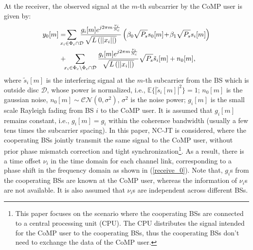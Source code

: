 \documentclass[10pt, doublecolumn]{IEEEtran}
\begin{document}
{At the receiver, {\color{black}the observed signal at the $m$-th subcarrier} by the CoMP user is given by:
\begin{align}\label{receive_0}
  y_0[m]=\!\!\!\!\!\!&\sum_{x_i\in \Phi _c\cap \mathcal{D}}{\!\!\!\!\frac{g_i[m]e^{j2\pi m \frac{\nu_i}{N_c}}}{\sqrt{L\left( ||x_i|| \right)}}\left( \beta _0\sqrt{P_s}s_0[m]\!+\!\beta _1\sqrt{P_s}s_i[m] \right)}\\\notag
  &+\!\!\!\sum_{x_i\in \Phi _c\backslash \Phi _c\cap \mathcal{D}}{\frac{g_i[m]e^{j2\pi m \frac{\nu_i}{N_c}}}{\sqrt{L\left( ||x_i|| \right)}}\sqrt{P_s}\tilde{s}_i[m]}+n_0[m],
\end{align}
where $\tilde{s}_i[m]$ is the interfering signal at the $m$-th subcarrier from the BS which is outside disc $\mathcal{D}$, whose power is normalized, i.e., $\mathbb{E}\{|\tilde{s}_i[m]|^2\}=1$;
$n_0[m]$ is the gaussian noise, $n_0[m] \sim \mathcal{CN}(0,\sigma^2)$, $\sigma^2$ is the noise power;
$g_i[m]$ is the small scale Rayleigh fading from BS $i$  to the CoMP user. It is assumed that $g_i[m]$ remains constant, i.e., $g_i[m]=g_i$ within the coherence bandwidth\cite{tanbourgi2014tractable} (usually a few tens times the subcarrier spacing).
In this paper, NC-JT is considered, where the cooperating BSs jointly transmit the same signal to the CoMP user, without prior phase mismatch correction and tight synchronization\cite{tanbourgi2014tractable}{\footnote{{\color{black}This paper focuses on the scenario where the cooperating BSs are connected to a central processing unit (CPU). The CPU distributes the signal intended for the CoMP user to the cooperating BSs, thus the cooperating BSs don't need to exchange the data of the CoMP user.}}}.
As a result, there is a time offset $\nu_i$ in the time domain for each channel link, corresponding to a phase shift in the frequency domain as shown in (\ref{receive_0}).
Note that, $g_i$s from the cooperating BSs are known at the CoMP user, whereas the information of $\nu_i$s are not available. It is also assumed that $\nu_i$s are independent across different BSs.
}
\end{document}

